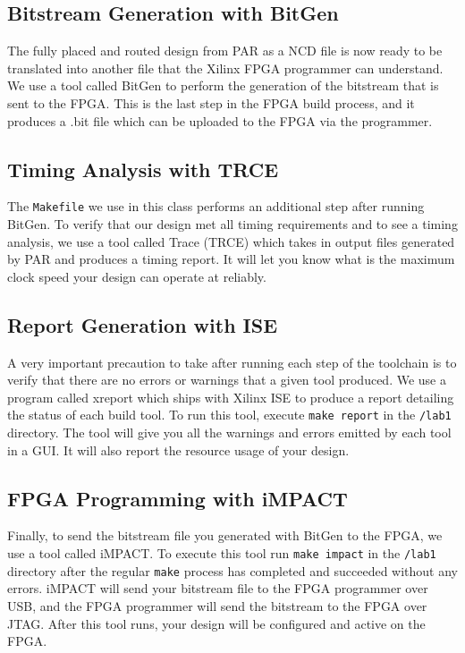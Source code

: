 \documentclass[11pt]{article}
\begin{document}
\subsection{Bitstream Generation with BitGen}
The fully placed and routed design from PAR as a NCD file is now ready to be translated into another file that the Xilinx FPGA programmer can understand. We use a tool called BitGen to perform the generation of the bitstream that is sent to the FPGA. This is the last step in the FPGA build process, and it produces a .bit file which can be uploaded to the FPGA via the programmer.

\subsection{Timing Analysis with TRCE}
The \verb|Makefile| we use in this class performs an additional step after running BitGen. To verify that our design met all timing requirements and to see a timing analysis, we use a tool called Trace (TRCE) which takes in output files generated by PAR and produces a timing report. It will let you know what is the maximum clock speed your design can operate at reliably.

\subsection{Report Generation with ISE}
A very important precaution to take after running each step of the toolchain is to verify that there are no errors or warnings that a given tool produced. We use a program called xreport which ships with Xilinx ISE to produce a report detailing the status of each build tool. To run this tool, execute \verb|make report| in the \verb|/lab1| directory. The tool will give you all the warnings and errors emitted by each tool in a GUI. It will also report the resource usage of your design.

\subsection{FPGA Programming with iMPACT}
Finally, to send the bitstream file you generated with BitGen to the FPGA, we use a tool called iMPACT. To execute this tool run \verb|make impact| in the \verb|/lab1| directory after the regular \verb|make| process has completed and succeeded without any errors. iMPACT will send your bitstream file to the FPGA programmer over USB, and the FPGA programmer will send the bitstream to the FPGA over JTAG. After this tool runs, your design will be configured and active on the FPGA.
\end{document}
